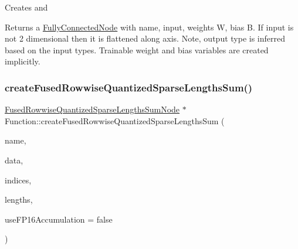 Creates and \begin{DoxyReturn}{Returns}
a \hyperlink{classglow_1_1_fully_connected_node}{Fully\+Connected\+Node} with {\ttfamily name}, {\ttfamily input}, weights {\ttfamily W}, bias {\ttfamily B}. If {\ttfamily input} is not 2 dimensional then it is flattened along {\ttfamily axis}. Note, output type is inferred based on the input types. Trainable weight and bias variables are created implicitly. 
\end{DoxyReturn}
\mbox{\label{classglow_1_1_function_a1ec48696db840ba590510e6c282b3a38}} 
\subsubsection{\texorpdfstring{create\+Fused\+Rowwise\+Quantized\+Sparse\+Lengths\+Sum()}{createFusedRowwiseQuantizedSparseLengthsSum()}\hspace{0.1cm}{\footnotesize\ttfamily [1/2]}}
{\footnotesize\ttfamily \hyperlink{classglow_1_1_fused_rowwise_quantized_sparse_lengths_sum_node}{Fused\+Rowwise\+Quantized\+Sparse\+Lengths\+Sum\+Node} $\ast$ Function\+::create\+Fused\+Rowwise\+Quantized\+Sparse\+Lengths\+Sum (\begin{DoxyParamCaption}\item[{llvm\+::\+String\+Ref}]{name,  }\item[{\hyperlink{classglow_1_1_constant}{Constant} $\ast$}]{data,  }\item[{\hyperlink{structglow_1_1_node_value}{Node\+Value}}]{indices,  }\item[{\hyperlink{structglow_1_1_node_value}{Node\+Value}}]{lengths,  }\item[{bool}]{use\+F\+P16\+Accumulation = {\ttfamily false} }\end{DoxyParamCaption})}

